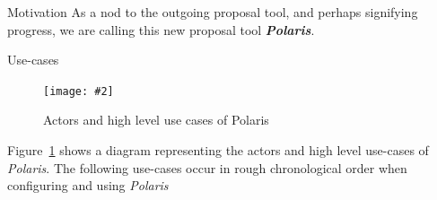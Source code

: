 \documentclass[final]{beamer}
\newlength{\colwidth}
\newcommand{\insertFigure}[3][width=1.0\textwidth]{%
    \begin{figure}[ht]
    \centering
    \texttt{[image: \#2]}
    \caption{#3}
    \label{fig:#2}
    \end{figure}
}
\begin{document}
\begin{frame}[t]
\begin{columns}[t]
\begin{column}{\colwidth}
\begin{block}{Motivation}
                    As a nod to the outgoing proposal tool, and perhaps signifying progress, we are calling this new
                    proposal tool \textbf{\emph{Polaris}}.

                \end{block}

                \begin{block}{Use-cases}

                    \insertFigure[width=38cm,height=40cm]{use-cases}{Actors and high level use cases of Polaris}

                    Figure~\ref{fig:use-cases} shows a diagram representing the actors and high level use-cases of
                    \emph{Polaris}.
                    The following use-cases occur in rough chronological order when configuring and using \emph{Polaris}


\end{block}
\end{column}
\end{columns}
\end{frame}
\end{document}
